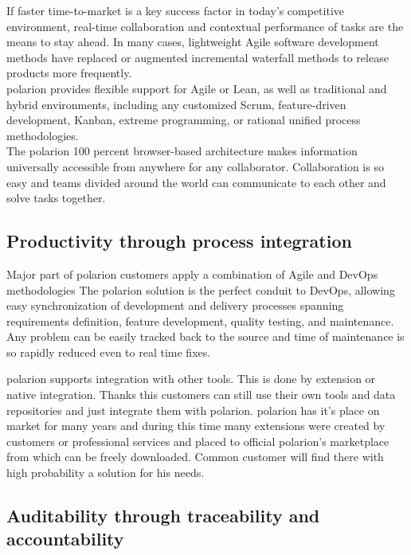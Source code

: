 \documentclass[thesis=M,english]{FITthesis}[2012/06/26]
\begin{document}
If faster time-to-market is a key success factor in today’s competitive environment, real-time collaboration and contextual performance 
of tasks are the means to stay ahead. In many cases, lightweight Agile software development methods have replaced or augmented incremental waterfall methods to release products more frequently.\\

\acrshort{polarion} provides flexible support for Agile or Lean, as well as traditional and hybrid environments, including any customized Scrum, feature-driven development, Kanban, extreme programming, or rational unified process methodologies.\\

The \acrshort{polarion} 100 percent browser-based architecture makes information universally accessible from anywhere for any collaborator. Collaboration is so easy and teams divided around the world can communicate to each other and solve tasks together.\\

\subsection{Productivity through process integration}

Major part of \acrshort{polarion} customers apply a combination of Agile and DevOps methodologies The \acrshort{polarion} solution is the perfect conduit to DevOps, allowing easy synchronization of development and delivery processes spanning requirements definition, feature development, quality testing, and maintenance. Any problem can be easily tracked back to the source and time of maintenance is so rapidly reduced even to real time fixes.

\acrshort{polarion} supports integration with other tools. This is done by extension or native integration. Thanks this customers can still use their own tools and data repositories and just integrate them with \acrshort{polarion}. \acrshort{polarion} has it's place on market for many years and during this time many extensions were created by customers or professional services and placed to official \acrshort{polarion}'s marketplace from which can be freely downloaded. Common customer will find there with high probability a solution for his needs.  

\subsection{Auditability through traceability and accountability}
\end{document}
